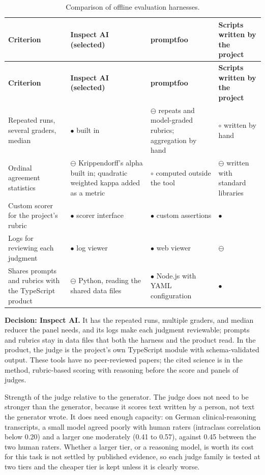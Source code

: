{\small
\begin{longtable}{|>{\raggedright\arraybackslash}p{}|>{\raggedright\arraybackslash}p{}|>{\raggedright\arraybackslash}p{}|>{\raggedright\arraybackslash}p{}|}
\caption{Comparison of offline evaluation harnesses.} \\
\hline
\textbf{Criterion} & \textbf{Inspect AI (selected)\cite{r129}} & \textbf{promptfoo\cite{r198}} & \textbf{Scripts written by the project} \\ \hline
\endfirsthead
\hline
\textbf{Criterion} & \textbf{Inspect AI (selected)\cite{r129}} & \textbf{promptfoo\cite{r198}} & \textbf{Scripts written by the project} \\ \hline
\endhead
Repeated runs, several graders, median & $\bullet$ built in & $\ominus$ repeats and model-graded rubrics; aggregation by hand & $\circ$ written by hand \\ \hline
Ordinal agreement statistics & $\ominus$ Krippendorff's alpha built in; quadratic weighted kappa added as a metric & $\circ$ computed outside the tool & $\ominus$ written with standard libraries \\ \hline
Custom scorer for the project's rubric & $\bullet$ scorer interface & $\bullet$ custom assertions & $\bullet$ \\ \hline
Logs for reviewing each judgment & $\bullet$ log viewer & $\bullet$ web viewer & $\ominus$ \\ \hline
Shares prompts and rubrics with the TypeScript product & $\ominus$ Python, reading the shared data files & $\bullet$ Node.js with YAML configuration & $\bullet$ \\ \hline
\end{longtable}
}

\textbf{Decision: Inspect AI.} It has the repeated runs, multiple graders, and median reducer the panel needs, and its logs make each judgment reviewable; prompts and rubrics stay in data files that both the harness and the product read. In the product, the judge is the project's own TypeScript module with schema-validated output. These tools have no peer-reviewed papers; the cited science is in the method, rubric-based scoring with reasoning before the score\cite{r58} and panels of judges\cite{r74}.

Strength of the judge relative to the generator. The judge does not need to be stronger than the generator, because it scores text written by a person, not text the generator wrote. It does need enough capacity: on German clinical-reasoning transcripts, a small model agreed poorly with human raters (intraclass correlation below 0.20) and a larger one moderately (0.41 to 0.57), against 0.45 between the two human raters\cite{r124}. Whether a larger tier, or a reasoning model, is worth its cost for this task is not settled by published evidence, so each judge family is tested at two tiers and the cheaper tier is kept unless it is clearly worse.

